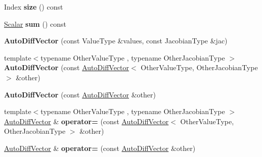 \begin{DoxyCompactItemize}
Index {\bfseries size} () const
\item 
\mbox{\label{class_eigen_1_1_auto_diff_vector_afacee684d50566591abb11c7654661b2}} 
\hyperlink{class_eigen_1_1_auto_diff_scalar}{Scalar} {\bfseries sum} () const
\item 
\mbox{\label{class_eigen_1_1_auto_diff_vector_a63ca0218770504e623af4211150af918}} 
{\bfseries Auto\+Diff\+Vector} (const Value\+Type \&values, const Jacobian\+Type \&jac)
\item 
\mbox{\label{class_eigen_1_1_auto_diff_vector_ac0e6c4be6a7273fe031534143855941b}} 
{\footnotesize template$<$typename Other\+Value\+Type , typename Other\+Jacobian\+Type $>$ }\\{\bfseries Auto\+Diff\+Vector} (const \hyperlink{class_eigen_1_1_auto_diff_vector}{Auto\+Diff\+Vector}$<$ Other\+Value\+Type, Other\+Jacobian\+Type $>$ \&other)
\item 
\mbox{\label{class_eigen_1_1_auto_diff_vector_a8594f8d205158989d0d1cb38c53ffe0a}} 
{\bfseries Auto\+Diff\+Vector} (const \hyperlink{class_eigen_1_1_auto_diff_vector}{Auto\+Diff\+Vector} \&other)
\item 
\mbox{\label{class_eigen_1_1_auto_diff_vector_a1a2b89be2583d4fb8b4386d1447e02d4}} 
{\footnotesize template$<$typename Other\+Value\+Type , typename Other\+Jacobian\+Type $>$ }\\\hyperlink{class_eigen_1_1_auto_diff_vector}{Auto\+Diff\+Vector} \& {\bfseries operator=} (const \hyperlink{class_eigen_1_1_auto_diff_vector}{Auto\+Diff\+Vector}$<$ Other\+Value\+Type, Other\+Jacobian\+Type $>$ \&other)
\item 
\mbox{\label{class_eigen_1_1_auto_diff_vector_a3af21d242fcc99f1424c2cf1f8cef77e}} 
\hyperlink{class_eigen_1_1_auto_diff_vector}{Auto\+Diff\+Vector} \& {\bfseries operator=} (const \hyperlink{class_eigen_1_1_auto_diff_vector}{Auto\+Diff\+Vector} \&other)
\item 
\mbox{\label{class_eigen_1_1_auto_diff_vector_a9d15830cda59daaf925f307948eea607}} 

\end{DoxyCompactItemize}

